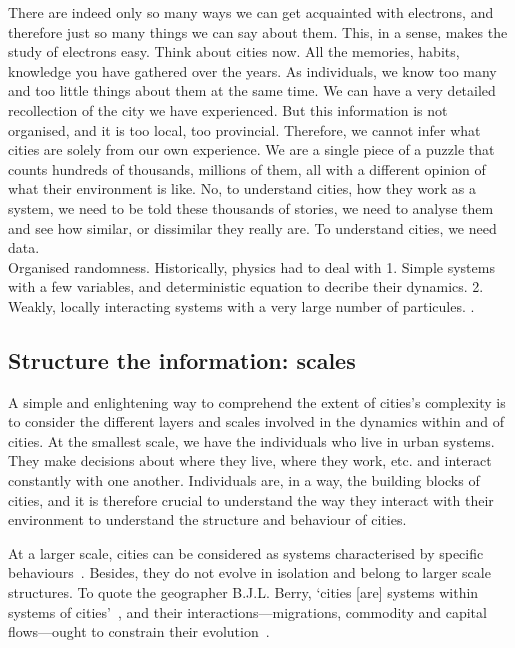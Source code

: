 There are indeed only so many ways we can get acquainted with electrons, and
therefore just so many things we can say about them. This, in a sense, makes the
study of electrons easy. Think about cities now. All the memories, habits,
knowledge you have gathered over the years. As individuals, we know too many and
too little things about them at the same time. We can have a very detailed
recollection of the city we have experienced. But this information is not
organised, and it is too local, too provincial. Therefore, we cannot infer what
cities are solely from our own experience.  We are a single piece of a puzzle
that counts hundreds of thousands, millions of them, all with a different
opinion of what their environment is like. No, to understand cities, how they
work as a system, we need to be told these thousands of stories, we need to
analyse them and see how similar, or dissimilar they really are. To understand
cities, we need data.\\

Organised randomness. Historically, physics had to deal with 1. Simple systems
with a few variables, and deterministic equation to decribe their dynamics. 2.
Weakly, locally interacting systems with a very large number of particules.
\cite{Parisi:1999}.

\subsection{Structure the information: scales}
\label{sub:structure_the_information_scales}

A simple and enlightening way to comprehend the extent of cities's complexity is
to consider the different layers and scales involved in the dynamics within and
of cities. At the smallest scale, we have the individuals who live in urban
systems. They make decisions about where they live, where they work, etc. and
interact constantly with one another. Individuals are, in a way, the building
blocks of cities, and it is therefore crucial to understand the way they
interact with their environment to understand the structure and behaviour of
cities.

At a larger scale, cities can be considered as systems characterised by specific
behaviours~\cite{Bettencourt:2007}. Besides, they do not evolve in isolation and
belong to larger scale structures. To quote the geographer B.J.L. Berry, `cities
[are] systems within systems of cities'~\cite{Berry:1964}, and their
interactions---migrations, commodity and capital flows---ought to constrain
their evolution~\cite{Pumain:2010}. 

